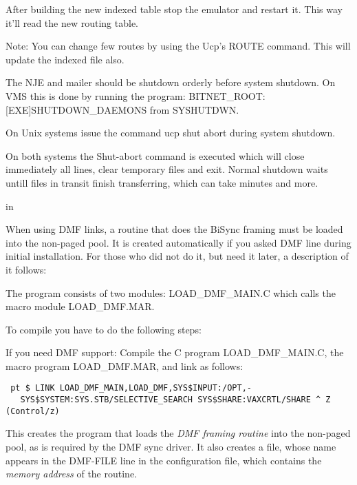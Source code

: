 After  building  the  new indexed table stop the emulator and restart
it. This way it'll read the new routing table.

{\ncrBold Note:} You can change few routes by using the Ucp's ROUTE command.
This will update the indexed file also.

\vfill\eject


The NJE and mailer should be shutdown orderly before system shutdown.
On    VMS    this    is     done     by     running     the     program:
BITNET\_ROOT:[EXE]SHUTDOWN\_DAEMONS from SYSHUTDWN.

On  Unix  systems  issue  the  command
{\ncrBold ucp shut abort} during system
shutdown.

On both systems the Shut-abort command is executed which  will  close
immediately  all  lines, clear temporary files and exit. Normal shutdown
waits untill files  in  transit  finish  transferring,  which  can  take
minutes and more.

 in

When  using DMF links, a routine that does the BiSync framing must be
loaded into the non-paged pool. It is created automatically if you asked
DMF  line  during initial installation. For those who did not do it, but
need it later, a description of it follows:

The program consists of two modules: LOAD\_DMF\_MAIN.C which calls  the
macro module LOAD\_DMF.MAR.

To compile you have to do the following steps:

{\ncrBold If  you  need  DMF  support}:  Compile the C program
{\ncrBold LOAD\_DMF\_MAIN.C}, the
macro program {\ncrBold LOAD\_DMF.MAR}, and link as follows:

{\obeylines\obeyspaces\tt{} pt
\$ LINK LOAD\_DMF\_MAIN,LOAD\_DMF,SYS\$INPUT:/OPT,-
~~~SYS\$SYSTEM:SYS.STB/SELECTIVE\_SEARCH
SYS\$SHARE:VAXCRTL/SHARE
\^~Z (Control/z)
}

This creates the program that loads the {\sl DMF  framing  routine} into the
{\ncrBold non-paged pool},
as is required by the DMF sync driver. It also creates a
file, whose name appears in the {\ncrBold DMF-FILE}
 line in the configuration file,
which contains the {\sl memory address} of the routine.

